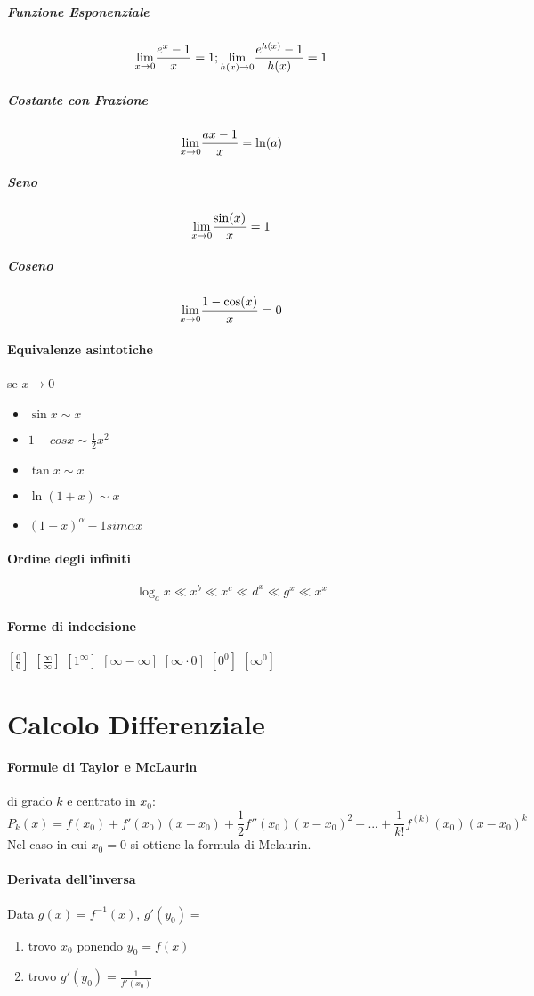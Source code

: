 \documentclass[12pt, a4paper, openany]{book}
\begin{document}
\subparagraph*{Funzione Esponenziale}
$$\underset{x \to 0}{\lim} \frac{e^x-1}{x} = 1; \underset{h(x) \to 0}{\lim} \frac{e^{h(x)}-1}{h(x)} = 1$$

\subparagraph*{Costante con Frazione}
$$\underset{x \to 0}{\lim}\frac{ax -1}{x} = \ln(a)$$ 

\subparagraph*{Seno}
$$\underset{x \to 0}{\lim}\frac{\sin(x)}{x} = 1$$

\subparagraph*{Coseno}
$$\underset{x \to 0}{\lim} \frac{1-\cos(x)}{x} = 0 $$

\paragraph*{Equivalenze asintotiche} se $x\to 0$
\begin{itemize}
    \item $\sin x \sim x$
    \item $1-cos x \sim \frac{1}{2}x^2$
    \item $\tan x \sim x$
    \item $\ln(1+x) \sim x$
    \item $(1+x)^\alpha -1 sim \alpha x$
\end{itemize}

\paragraph*{Ordine degli infiniti}
$$ \log_ax\ll x^b\ll x^c\ll d^x\ll g^x\ll x^x $$


\paragraph*{Forme di indecisione}
	$[\frac{0}{0}]$ $[\frac{\infty}{\infty}]$ $[1^\infty]$ $[\infty - \infty]$ $[\infty \cdot 0]$ $[0^0]$ $[\infty^0]$

\section*{Calcolo Differenziale}
\paragraph*{Formule di Taylor e McLaurin} di grado $k$ e centrato in $x_0$:
$$P_k(x)=f(x_0)+f'(x_0)(x-x_0) + \frac{1}{2}f''(x_0)(x-x_0)^2 +... + \frac{1}{k!}f^{(k)}(x_0)(x-x_0)^k$$
Nel caso in cui $x_0=0$ si ottiene la formula di Mclaurin.
\paragraph*{Derivata dell'inversa} Data $g(x) = f^{-1}(x)$, $g'(y_0)=$
\begin{enumerate}
	\item trovo $x_0$ ponendo $y_0=f(x)$
	\item trovo $g'(y_0)=\frac{1}{f'(x_0)}$
\end{enumerate}
\end{document}
